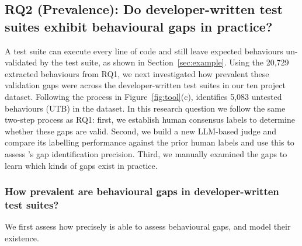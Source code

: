 \subsection{RQ2 (Prevalence): Do developer-written test suites exhibit behavioural gaps in practice?}
\label{sec:rq2}


A test suite can execute every line of code and still leave expected behaviours un-validated by the test suite, as shown in Section~\ref{sec:example}. 
Using the 20,729 extracted behaviours from RQ1, we next investigated how prevalent these validation gaps were across the developer-written test suites in our ten project dataset.
Following the process in Figure~\ref{fig:tool}(c), \toolname{} identifies 5,083 untested behaviours (UTB) 
in the dataset.
In this research question we follow the same two-step process as RQ1: first, we establish human consensus labels to determine whether these gaps are valid. Second, we build a new LLM-based judge and compare its labelling performance against the prior human labels and use this to assess \toolname{}'s gap identification precision.
Third, we manually examined the gaps to learn which kinds of gaps exist in practice.

\smallskip
\subsubsection{How prevalent are behavioural gaps in developer-written test suites?} 
We first assess how precisely \toolname{} is able to assess behavioural gaps, and model their existence. %



